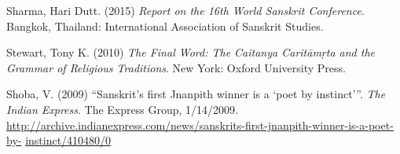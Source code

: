 \begin{thebibliography}{99}
Sharma, Hari Dutt. (2015) {\sl Report on the 16th World Sanskrit Conference}. Bangkok, Thailand: International Association of Sanskrit Studies. 

Stewart, Tony K. (2010) {\sl The Final Word: The Caitanya Caritāmṛta and the Grammar of Religious Traditions}. New York: Oxford University Press. 

Shoba, V. (2009) “Sanskrit’s first Jnanpith winner is a ‘poet by instinct’”. {\sl The Indian Express}. The Express Group, 1/14/2009. 
{\fontsize{11}{13}\selectfont\url{http://archive.indianexpress.com/news/sanskrits-first-jnanpith-winner-is-a-poet-by-} \url{instinct/410480/0}}

\end{thebibliography}

\theendnotes
